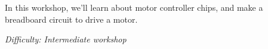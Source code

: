%
%
%

\newif\ifprint
\printfalse



\newcommand{\workshopTitle}{Workshop 11: GPIO \& Motors}

\newcommand{\workshopAuthor}{Jack Kelly}



	
	
	In this workshop, we'll learn about motor controller chips, and make a breadboard circuit to drive a motor. 
	
	\textit{Difficulty: Intermediate workshop}
	
	\ifprint
		\renewcommand{\baselinestretch}{0.75}\normalsize
		\tableofcontents
		\renewcommand{\baselinestretch}{1.0}\normalsize
	\else
		\tableofcontents
	\fi
	
	
	
		\clearpage
	
		\webclearpage
	
		\webclearpage
	
	\begin{appendices}
		
		
		\ifprint\else
			\clearpage
			
		\fi
	\end{appendices}

